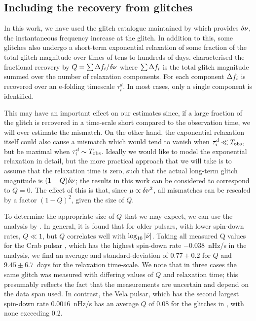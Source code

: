 \documentclass[../full_thesis/full_thesis.tex]{subfiles}
\begin{document}
\subsection{Including the recovery from glitches}
\label{sec: recovery}
In this work, we have used the glitch catalogue maintained by \citet{Espinoza2011}
which provides $\delta\nu$, the instantaneous frequency increase at the
glitch. In addition to this, some glitches also undergo a short-term
exponential relaxation of some fraction of the total glitch magnitude over
times of tens to hundreds of days. \citet{Lyne2000} characterised the
fractional recovery by $Q = \sum \Delta f_i/\delta\nu$ where $\sum
\Delta f_i$ is the total glitch magnitude summed over the number of relaxation
components. For each component $\Delta f_i$ is recovered over an
e-folding timescale $\tau^d_i$. In most cases, only a single component is
identified.

This may have an important effect on our estimates since, if a large fraction
of the glitch is recovered in a time-scale short compared to the observation
time, we will over estimate the mismatch. On the other hand, the exponential
relaxation itself could also cause a mismatch which would tend to vanish when
$\tau^d_i \ll T_{\mathrm{obs}}$, but be maximal when $\tau^d_i \sim T_{\mathrm{obs}}$.  Ideally we would
like to model the exponential relaxation in detail, but the more practical
approach that we will take is to assume that the relaxation time is zero, such
that the actual long-term glitch magnitude is $(1-Q)\delta\nu$; the results in
this work can be considered to correspond to $Q=0$. The effect of this is that,
since $\mu \propto \delta\nu^2$, all mismatches can be rescaled by a factor
$(1-Q)^{2}$, given the size of $Q$.

To determine the appropriate size of $Q$ that we may expect, we can use the
analysis by \citet{Lyne2000}. In general, it is found that for older pulsars,
with lower spin-down rates, $Q\ll1$, but $Q$ correlates well with
$\log_{10}|\dot{\nu}|$. Taking all measured Q values for the Crab pulsar
\citep{Lyne2000, Wang2001, Wang2012}, which has the highest spin-down rate
$-0.038$~nHz/s in the analysis, we find an average and standard-deviation of
$0.77\pm0.2$ for $Q$ and $9.45\pm6.7$~days for the relaxation time-scale. We
note that in three cases the same glitch was measured with differing values of
$Q$ and relaxation time; this presumably reflects the fact that the
measurements are uncertain and depend on the data span used. In contrast, the
Vela pulsar, which has the second largest spin-down rate $0.0016$~nHz/s has an
average $Q$ of 0.08 for the glitches in \citet{Lyne2000}, with none exceeding
0.2.
\end{document}
